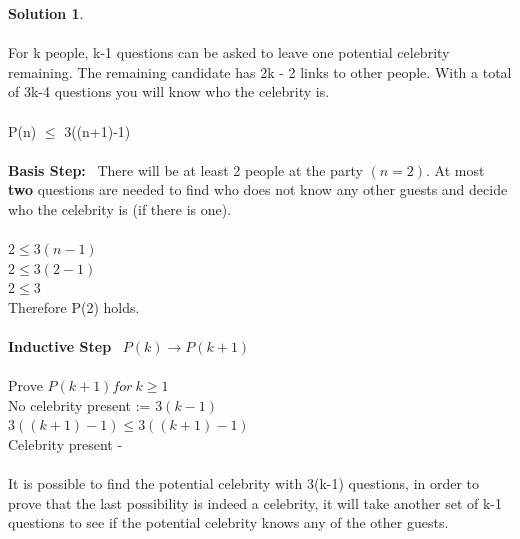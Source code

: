 \documentclass{article}
\theoremstyle{definition}
\newtheorem*{solution}{Solution}
\begin{document}
\begin{solution}\ \\
\ \\
For k people, k-1 questions can be asked to leave one potential celebrity remaining. The remaining candidate has 2k - 2 links to other people. With a total of 3k-4 questions you will know who the celebrity is.\ \\
\ \\
P(n) $\leq$ 3((n+1)-1)\ \\
\ \\
\textbf{Basis Step:} \ There will be at least 2 people at the party $(n=2)$. At most \textbf{two} questions are needed to find who does not know any other guests and decide who the celebrity is (if there is one).\ \\
\ \\
$2 \leq 3(n-1)$\ \\
$2 \leq 3(2-1)$\ \\
$2 \leq 3$\ \\
Therefore P(2) holds.\ \\
\ \\
\textbf{Inductive Step} \ $P(k) \xrightarrow{} P(k+1)$\ \\
\ \\
Prove $P(k+1) for \  k \geq 1$\ \\
No celebrity present := $3(k-1)$\ \\
$3((k+1) -1) \leq 3((k+1)-1)$\ \\
Celebrity present - \ \\
\ \\
It is possible to find the potential celebrity with 3(k-1) questions, in order to prove that the last possibility is indeed a celebrity, it will take another set of k-1 questions to see if the potential celebrity knows any of the other guests.
\ \\ 

\end{solution}

\newpage
\end{document}
